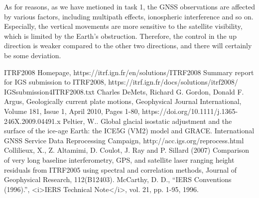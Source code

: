 \documentclass{article}
\begin{document}
As for reasons, as we have metioned in task 1, the GNSS observations are affected by various factors,
including multipath effects, ionospheric interference and so on.
Especially, the vertical movements are more sensitive to the satellite visibility,
which is limited by the Earth's obstruction. 
Therefore, the control in the up direction is weaker compared to the other two directions, 
and there will certainly be some deviation.

\begin{thebibliography}{99}
  ITRF2008 Homepage, https://itrf.ign.fr/en/solutions/ITRF2008
  Summary report for IGS submission to ITRF2008, https://itrf.ign.fr/docs/solutions/itrf2008/ IGSsubmission4ITRF2008.txt
  Charles DeMets, Richard G. Gordon, Donald F. Argus, Geologically current plate motions, Geophysical Journal International, Volume 181, Issue 1, April 2010, Pages 1-80, https://doi.org/10.1111/j.1365-246X.2009.04491.x
  Peltier, W.. Global glacial isostatic adjustment and the surface of the ice-age Earth: the ICE5G (VM2) model and GRACE. 
  International GNSS Service
  Data Reprocessing Campaign, http://acc.igs.org/reprocess.html
  Collilieux, X., Z. Altamimi, D. Coulot, J. Ray and P. Sillard (2007) Comparison of very long baseline interferometry, GPS, and satellite laser ranging height residuals from ITRF2005 using spectral and correlation methods, Journal of Geophysical Research, 112(B12403).
  McCarthy, D. D., “IERS Conventions (1996).”, <i>IERS Technical Note</i>, vol. 21, pp. 1-95, 1996.
\end{thebibliography}
\end{document}
